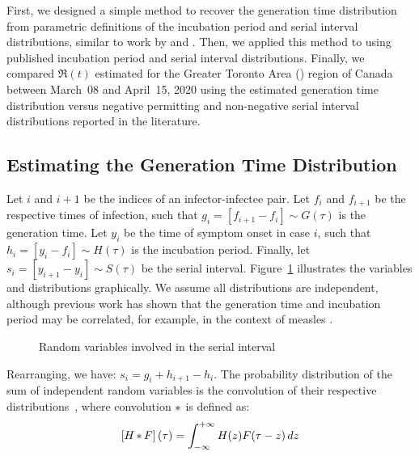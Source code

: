 First, we designed a simple method to
recover the generation time distribution
from parametric definitions of
the incubation period and serial interval distributions,
similar to work by \textcite{Kuk2005} and \textcite{Britton2019}.
Then, we applied this method to \covid using
published incubation period and serial interval distributions.
Finally, we compared $\Re(t)$ estimated for
the Greater Toronto Area (\gta) region of Canada
between March~08 and April~15, 2020 using
the estimated generation time distribution versus
negative permitting and non-negative serial interval distributions
reported in the literature.
\subsection{Estimating the Generation Time Distribution}
Let $i$ and $i+1$ be the indices of an infector-infectee pair.
Let $f_i$ and $f_{i+1}$ be the respective times of infection,
such that $g_i = [f_{i+1} - f_i] \sim G(\tau)$ is the generation time.
Let $y_i$ be the time of symptom onset in case $i$,
such that $h_i = [y_i - f_i] \sim H(\tau)$ is the incubation period.
Finally, let $s_i = [y_{i+1} - y_i] \sim S(\tau)$ be the serial interval.
Figure~\ref{fig:nodes} illustrates the variables and distributions graphically.
We assume all distributions are independent,
although previous work has shown that
the generation time and incubation period may be correlated,
for example, in the context of measles \cite{Klinkenberg2011}.
\par
\begin{figure}
  \centering
  
  \caption{Random variables involved in the serial interval}
  \label{fig:nodes}
\end{figure}
\par
Rearranging, we have:
$s_i = g_i + h_{i+1} - h_i$.
The probability distribution of
the sum of independent random variables
is the convolution of their respective distributions~\cite{Hogg2005},
where convolution $\mathop{\ast}$ is defined as:
\begin{equation}\label{eq:conv}
  \left[H \mathop{\ast} F\right](\tau) = \int_{-\infty}^{+\infty} H(z) F(\tau - z) \,dz
\end{equation}
